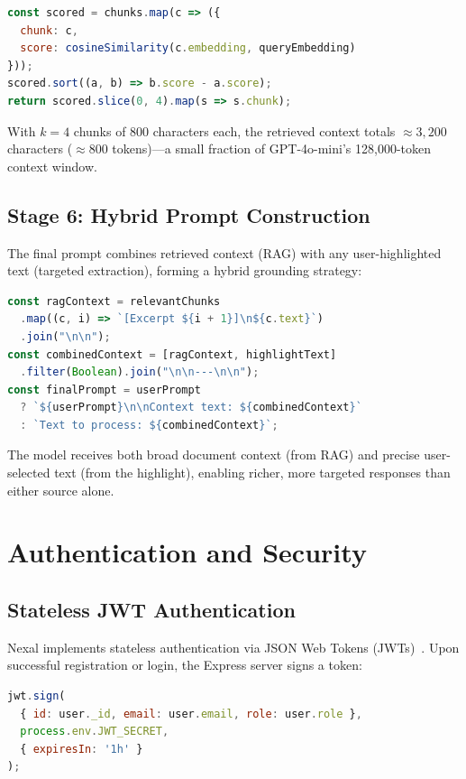 \documentclass[conference]{IEEEtran}
\begin{document}
\begin{lstlisting}[language=JavaScript, caption={Cosine similarity retrieval}]
const scored = chunks.map(c => ({
  chunk: c,
  score: cosineSimilarity(c.embedding, queryEmbedding)
}));
scored.sort((a, b) => b.score - a.score);
return scored.slice(0, 4).map(s => s.chunk);
\end{lstlisting}

With $k = 4$ chunks of 800 characters each, the retrieved context totals $\approx 3{,}200$ characters ($\approx 800$ tokens)---a small fraction of GPT-4o-mini's 128,000-token context window.

\subsection{Stage 6: Hybrid Prompt Construction}

The final prompt combines retrieved context (RAG) with any user-highlighted text (targeted extraction), forming a hybrid grounding strategy:

\begin{lstlisting}[language=JavaScript, caption={Hybrid prompt construction}]
const ragContext = relevantChunks
  .map((c, i) => `[Excerpt ${i + 1}]\n${c.text}`)
  .join("\n\n");
const combinedContext = [ragContext, highlightText]
  .filter(Boolean).join("\n\n---\n\n");
const finalPrompt = userPrompt
  ? `${userPrompt}\n\nContext text: ${combinedContext}`
  : `Text to process: ${combinedContext}`;
\end{lstlisting}

The model receives both broad document context (from RAG) and precise user-selected text (from the highlight), enabling richer, more targeted responses than either source alone.

\section{Authentication and Security}
\label{sec:auth}

\subsection{Stateless JWT Authentication}

Nexal implements stateless authentication via JSON Web Tokens (JWTs)~\cite{jwt2015}. Upon successful registration or login, the Express server signs a token:

\begin{lstlisting}[language=JavaScript, caption={JWT signing}]
jwt.sign(
  { id: user._id, email: user.email, role: user.role },
  process.env.JWT_SECRET,
  { expiresIn: '1h' }
);
\end{lstlisting}
\end{document}
